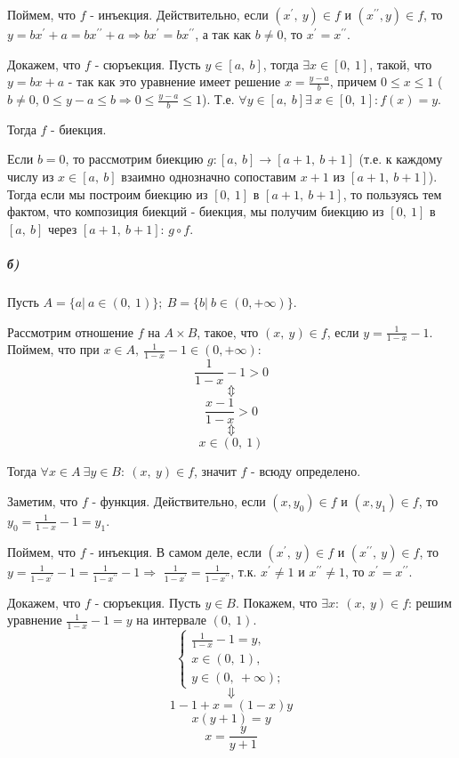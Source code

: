 \documentclass{article}
\newcommand{\pr}{^{\prime}}
\newcommand{\ppr}{^{\prime\prime}}
\newcommand{\pair}[2]{(#1,\ #2)}
\newcommand{\andi}{$ и $}
\begin{document}
		Поймем, что $f$ - инъекция. Действительно, если $(x\pr,\ y) \in f$ и $(x\ppr, y) \in f$, то $y = bx\pr + a = bx\ppr + a \Rightarrow bx\pr = bx\ppr$, а так как $b \ne 0$, то $x\pr = x\ppr$. 
		
		Докажем, что $f$ - сюръекция. Пусть $y \in [a,\ b]$, тогда $\exists x \in [0,\ 1]$, такой, что $y = bx + a$ - так как это уравнение имеет решение $x = \frac{y - a}{b}$, причем $0 \leqslant x \leqslant 1$ ($b \ne 0$, $0 \leqslant y - a \leqslant b \Rightarrow  0 \leqslant \frac{y - a}{b} \leqslant 1$). Т.е. $\forall y \in [a,\ b] \exists\ x \in [0,\ 1]: f(x) = y$.
		
		Тогда $f$ - биекция.  
		
		Если $b = 0$, то рассмотрим биекцию $g:[a,\ b] \rightarrow [a + 1,\ b + 1]$ (т.е. к каждому числу из $x \in [a,\ b]$ взаимно однозначно сопоставим $x + 1$ из $[a + 1,\ b + 1]$). Тогда если мы построим биекцию из $[0,\ 1]$ в $[a + 1,\ b + 1]$, то пользуясь тем фактом, что композиция биекций - биекция, мы получим биекцию из $[0,\ 1]$ в $[a,\ b]$ через $[a + 1,\ b + 1]$: $g \circ f$.
		
		\subparagraph{б)}
		Пусть $A = \{a|\ a \in (0,\ 1)\};\ B = \{b|\ b \in (0, + \infty)\}$.
	
		Рассмотрим отношение $f$ на $A \times B$, такое, что $(x,\ y) \in f$, если $y = \frac{1}{1 - x} - 1$. Поймем, что при $x \in A,\ \frac{1}{1 - x} - 1 \in (0, + \infty)$:
			$$\frac{1}{1 - x} - 1 > 0$$
			$$\Updownarrow$$
			$$\frac{x - 1}{1 - x} > 0 $$
			$$\Updownarrow$$
			$$x \in (0,\ 1)$$
		
		Тогда $\forall x \in A\ \exists y \in B:\ (x,\ y) \in f$, значит $f$ - всюду определено.
		
		Заметим, что $f$ - функция. Действительно, если $(x, y_0) \in f$ и $(x, y_1) \in f$, то $y_0 = \frac{1}{1 - x} - 1 = y_1$.
		
		Поймем, что $f$ - инъекция. В самом деле, если $\pair{x\pr}{y} \in f$ и $\pair{x\ppr}{y} \in f$, то $y = \frac{1}{1 - x\pr} - 1 = \frac{1}{1 - x\ppr} - 1 \Rightarrow$ $\frac{1}{1 - x\pr} = \frac{1}{1 - x\ppr}$, т.к. $x\pr \ne 1 \andi x\ppr \ne 1$, то $x\pr = x\ppr$.
		
		Докажем, что $f$ - сюръекция. Пусть $y \in B$. Покажем, что $\exists x:\ (x,\ y) \in f$: решим уравнение $\frac{1}{1 - x} - 1 = y$ на интервале $(0,\ 1)$.
		\begin{equation*}
		\begin{cases}
		\frac{1}{1 - x} - 1 = y, 
		\\
		x \in (0,\ 1),
		\\
		y \in (0,\ +\infty);
		\end{cases}
		\end{equation*}
		$$ \Downarrow $$
		$$1 - 1 + x = (1 - x)y$$
		$$x(y + 1) = y$$
		$$x = \frac{y}{y + 1}$$
		
\end{document}
